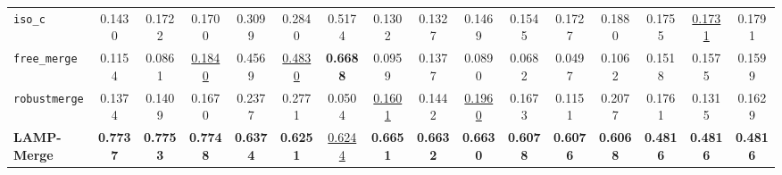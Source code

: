 \begin{table}[t]
\begin{tabular}{lccccccccccccccc}
\texttt{iso\_c} & 0.1430 & 0.1722 & 0.1700 & 0.3099 & 0.2840 & 0.5174 & 0.1302 & 0.1327 & 0.1469 & 0.1545 & 0.1727 & 0.1880 & 0.1755 & \underline{0.1731} & 0.1791 \\
\texttt{free\_merge} & 0.1154 & 0.0861 & \underline{0.1840} & 0.4569 & \underline{0.4830} & \textbf{0.6688} & 0.0959 & 0.1377 & 0.0890 & 0.0682 & 0.0497 & 0.1062 & 0.1518 & 0.1575 & 0.1599 \\
\texttt{robustmerge} & 0.1374 & 0.1409 & 0.1670 & 0.2377 & 0.2771 & 0.0504 & \underline{0.1601} & 0.1442 & \underline{0.1960} & 0.1673 & 0.1151 & 0.2077 & 0.1761 & 0.1315 & 0.1629 \\
\textbf{LAMP-Merge} & \textbf{0.7737} & \textbf{0.7753} & \textbf{0.7748} & \textbf{0.6374} & \textbf{0.6251} & \underline{0.6244} & \textbf{0.6651} & \textbf{0.6632} & \textbf{0.6630} & \textbf{0.6078} & \textbf{0.6076} & \textbf{0.6068} & \textbf{0.4816} & \textbf{0.4816} & \textbf{0.4816} \\
\bottomrule
\end{tabular}
\end{table}

